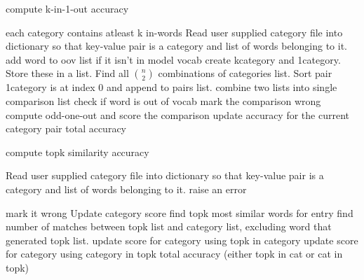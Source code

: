 \documentclass[11]{article}
\begin{document}
\begin{algorithm}
\caption{compute k-in-1-out accuracy}
\begin{algorithmic}[1]
\REQUIRE each category contains atleast k in-words
\STATE Read user supplied category file into dictionary so that key-value pair is a category and list of words belonging to it.
\STATE add word to oov list if it isn't in model vocab
\ENDFOR
\ENDFOR
{}
\STATE create kcategory and 1category.
\STATE Store these in a list.
\ENDFOR
\STATE Find all $n \choose 2$ combinations of categories list.
\STATE Sort pair 1category is at index $0$ and append to pairs list.
\ENDIF
\ENDFOR
{}
\STATE combine two lists into single comparison list
\STATE check if word is out of vocab
\ENDFOR
{} 
\STATE mark the comparison wrong
\ELSE {} 
\STATE compute odd-one-out and score the comparison
\ENDIF
\ENDIF
\ENDFOR
\ENDFOR
\STATE update accuracy for the current category pair
\ENDFOR
\RETURN total accuracy
\end{algorithmic}
\end{algorithm}

\begin{algorithm}
\caption{compute topk similarity accuracy}
\begin{algorithmic}[1]
\STATE Read user supplied category file into dictionary so that key-value pair is a category and list of words belonging to it.
\STATE raise an error
\ENDIF
\ENDFOR
\ENDFOR
\ENDIF

\STATE mark it wrong
\STATE Update category score
\ENDIF 
\ELSE 
\STATE find topk most similar words for entry
\STATE find number of matches between topk list and category list, excluding word that generated topk list.
\ENDFOR
\ENDFOR
\ENDIF
\ENDFOR
{}
\STATE update score for category using topk in category
\ELSE
\STATE update score for category using category in topk
\ENDIF
\ENDFOR
\RETURN total accuracy (either topk in cat or cat in topk)

\end{algorithmic}
\end{algorithm}
\end{document}
